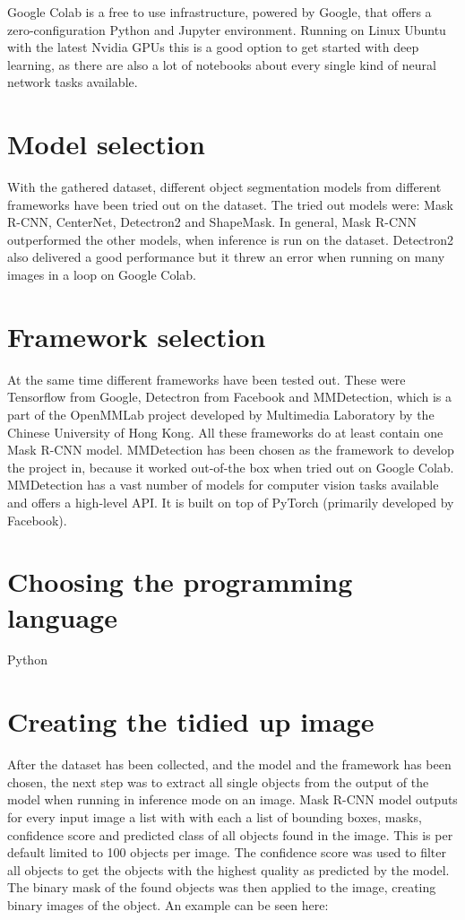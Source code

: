 Google Colab is a free to use infrastructure, powered by Google, that offers a zero-configuration Python and Jupyter environment. Running on Linux Ubuntu with the latest Nvidia GPUs this is a good option to get started with deep learning, as there are also a lot of notebooks about every single kind of neural network tasks available.

\section{Model selection}

With the gathered dataset, different object segmentation models from different frameworks have been tried out on the dataset.
The tried out models were: Mask R-CNN, CenterNet, Detectron2 and ShapeMask. In general, Mask R-CNN outperformed the other models, when inference is run on the dataset. Detectron2 also delivered a good performance but it threw an error when running on many images in a loop on Google Colab.

\section{Framework selection}

At the same time different frameworks have been tested out. These were Tensorflow from Google, Detectron from Facebook and MMDetection, which is a part of the OpenMMLab project developed by Multimedia Laboratory by the Chinese University of Hong Kong. All these frameworks do at least contain one Mask R-CNN model. MMDetection has been chosen as the framework to develop the project in, because it worked out-of-the box when tried out on Google Colab. MMDetection has a vast number of models for computer vision tasks available and offers a high-level API. It is built on top of PyTorch (primarily developed by Facebook).

\section{Choosing the programming language}

Python

\section{Creating the tidied up image}

After the dataset has been collected, and the model and the framework has been chosen, the next step was to extract all single objects from the output of the model when running in inference mode on an image. Mask R-CNN model outputs for every input image a list with with each a list of bounding boxes, masks, confidence score and predicted class of all objects found in the image. This is per default limited to 100 objects per image. The confidence score was used to filter all objects to get the objects with the highest quality as predicted by the model. The binary mask of the found objects was then applied to the image, creating binary images of the object. An example can be seen here:

